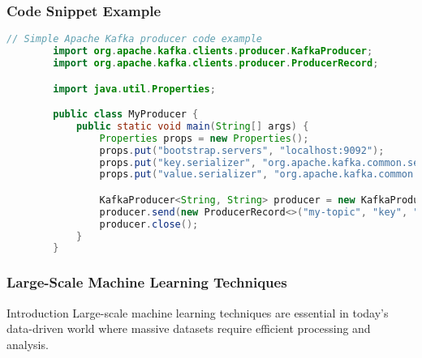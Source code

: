 \documentclass[aspectratio=169]{beamer}
\begin{document}
\begin{frame}[fragile]
    \frametitle{Code Snippet Example}
    \begin{lstlisting}[language=Java, basicstyle=\footnotesize]
        // Simple Apache Kafka producer code example
        import org.apache.kafka.clients.producer.KafkaProducer;
        import org.apache.kafka.clients.producer.ProducerRecord;

        import java.util.Properties;

        public class MyProducer {
            public static void main(String[] args) {
                Properties props = new Properties();
                props.put("bootstrap.servers", "localhost:9092");
                props.put("key.serializer", "org.apache.kafka.common.serialization.StringSerializer");
                props.put("value.serializer", "org.apache.kafka.common.serialization.StringSerializer");

                KafkaProducer<String, String> producer = new KafkaProducer<>(props);
                producer.send(new ProducerRecord<>("my-topic", "key", "value"));
                producer.close();
            }
        }
    \end{lstlisting}
\end{frame}

\begin{frame}[fragile]
    \frametitle{Large-Scale Machine Learning Techniques}
    \begin{block}{Introduction}
        Large-scale machine learning techniques are essential in today's data-driven world where massive datasets require efficient processing and analysis. 
    \end{block}
\end{frame}
\end{document}
